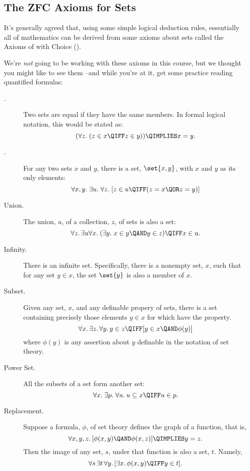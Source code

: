 \subsection{The ZFC Axioms for Sets}
It's generally agreed that, using some simple logical deduction rules,
essentially all of mathematics can be derived from some axioms about sets
called the Axioms of  with Choice ().

We're \emph{not} going to be working with these axioms in this course,
but we thought you might like to see them --and while you're at it, get
some practice reading quantified formulas:
%

\begin{description}

\item[.] Two sets are equal if they have the same members.
In formal logical notation, this would be stated as:
\[
(\forall z.\; (z \in x \QIFF z \in y)) \QIMPLIES x = y.
\]

\item[.] For any two sets $x$ and $y$, there is a set,
     $\set{x,y}$, with $x$ and $y$ as its only elements:
\[
\forall x,y.\; \exists u.\; \forall z.\;
[z \in u \QIFF (z = x \QOR z = y)]
\]

\item[Union.] The union, $u$, of a collection, $z$, of sets is also a set:
\[
\forall z.\, \exists u \forall x.\; (\exists y.\; x \in y \QAND y \in z) \QIFF x \in u.
\]

\item[Infinity.]  There is an infinite set.
  Specifically, there is a nonempty set, $x$, such that for any set $y \in
  x$, the set $\set{y}$ is also a member of $x$.


\item[Subset.] Given any set, $x$, and any definable propery of sets,
  there is a set containing precisely those elements $y \in x$ for
  which have the property.
\[
\forall x.\, \exists z.\, \forall y.\, y \in z \QIFF [y \in x \QAND \phi(y)]
\]
where $\phi(y)$ is any assertion about $y$ definable in the notation
of set theory.

\item[Power Set.]  All the subsets of a set form another set:
\[
\forall x.\; \exists p.\; \forall u.\: u \subseteq x \QIFF u \in p.
\]

\item[Replacement.]  Suppose a formula, $\phi$,
  of set theory defines the graph of a function, that is,
\[
\forall x, y, z.\, [\phi(x,y) \QAND \phi(x,z)] \QIMPLIES y = z.
\]
Then the image of any set, $s$, under that function is also a set, $t$.  Namely,
\[
\forall s\, \exists t\, \forall y.\, [\exists x.\, \phi(x,y) \QIFF y \in t].
\]


\end{description}
